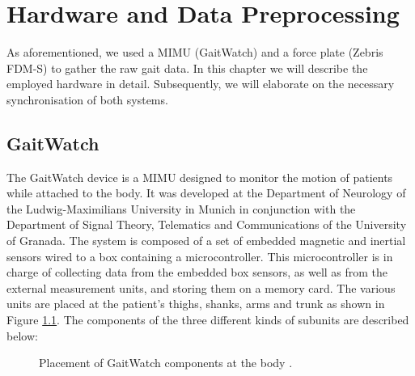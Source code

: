 \chapter{Hardware and Data Preprocessing}
\label{ch:Hardware}

As aforementioned, we used a MIMU (GaitWatch) and a force plate (Zebris FDM-S) to gather the raw gait data. In this chapter we will describe the employed hardware in detail. Subsequently, we will elaborate on the necessary synchronisation of both systems.

\section{GaitWatch}

The GaitWatch device \cite{olivares_vicente_gaitwatch_2013} is a MIMU designed to monitor the motion of patients while attached to the body. It was developed at the Department of Neurology of the Ludwig-Maximilians University in Munich in conjunction with the Department of Signal Theory, Telematics and Communications of the University of Granada. The system is composed of a set of embedded magnetic and inertial sensors wired to a box containing a microcontroller. This microcontroller is in charge of collecting data from the embedded box sensors, as well as from the external measurement units, and storing them on a memory card. The various units are placed at the patient's thighs, shanks, arms and trunk as shown in Figure \ref{fig:GaitWatch_placement}. The components of the three different kinds of subunits are described below:

\begin{figure}
	\centering
	\caption{Placement of GaitWatch components at the body \cite{olivares_vicente_gaitwatch_2013}.}
	\label{fig:GaitWatch_placement}
\end{figure}

